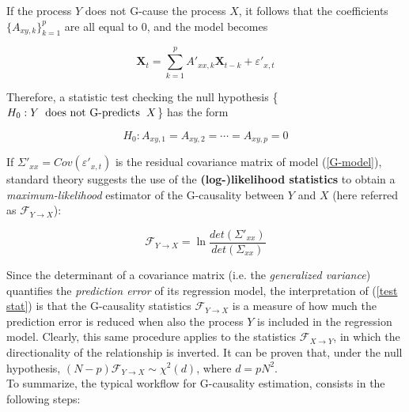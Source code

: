 \documentclass[12pt, a4paper]{report}
\begin{document}
If the process $Y$ does not G-cause the process $X$, it follows that the coefficients $\{A_{xy,k}\}_{k=1}^p $ are all equal to $0$, and the model becomes

\begin{equation}
\textbf{X}_t = \sum_{k=1}^{p} A'_{xx,k} \textbf{X}_{t-k} + \varepsilon'_{x,t} \label{G-model}
\end{equation}

Therefore, a statistic test checking  the null hypothesis \{$ H_0:  Y \hspace{0.2cm} \text{does not G-predicts} \hspace{0.2 cm} X $\} has the form

\begin{equation}
H_0: A_{xy,1} = A_{xy,2} = \cdots = A_{xy,p} = 0
\end{equation}


If  $\Sigma'_{xx} = Cov(\varepsilon'_{x,t}) $ is the residual covariance matrix of model (\ref{G-model}), standard theory \cite{22} %
 suggests the use of the \textbf{(log-)likelihood statistics} to obtain a \textit{maximum-likelihood} estimator of the G-causality between $Y$ and $X$ (here referred as $ \mathcal{F}_{Y \rightarrow X} $):

\begin{equation}
\mathcal{F}_{Y \rightarrow X}  = \ln \frac{det(\Sigma'_{xx})}{det(\Sigma_{xx})} \label{test stat}
\end{equation}


Since the determinant of a covariance matrix (i.e. the \textit{generalized variance}) quantifies the \textit{prediction error} of its regression model, the interpretation of (\ref{test stat}) is that the G-causality statistics  $ \mathcal{F}_{Y \rightarrow X} $ is a measure of how much the prediction error is reduced when also the process $Y$ is included in the regression model. Clearly, this same procedure applies to the statistics  $ \mathcal{F}_{X \rightarrow Y} $, in which the directionality of the relationship is inverted. It can be proven \cite{23} %
 that, under the null hypothesis, $ (N-p)\mathcal{F}_{Y \rightarrow X} \sim \chi^2(d)$, where $ d = pN^2$.
\\
To summarize, the typical workflow for G-causality estimation, consists in the following steps:
\end{document}
